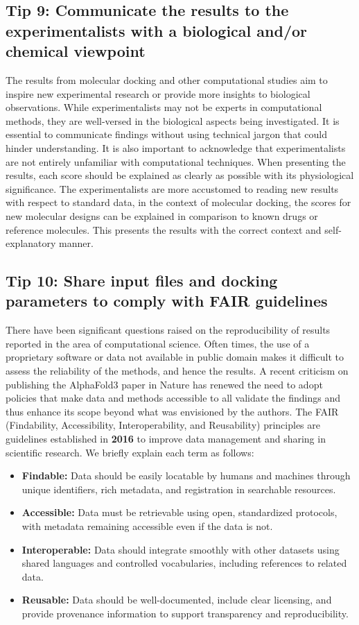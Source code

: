 \documentclass[10pt,letterpaper]{article}
\begin{document}
{{\subsection*{Tip 9: Communicate the results to the experimentalists with a biological and/or chemical viewpoint}
The results from molecular docking and other computational studies aim to inspire new experimental research or provide more insights to biological observations. While experimentalists may not be experts in computational methods, they are well-versed in the biological aspects being investigated. It is essential to communicate findings without using technical jargon that could hinder understanding. It is also important to acknowledge that experimentalists are not entirely unfamiliar with computational techniques. When presenting the results, each score should be explained as clearly as possible with its physiological significance. The experimentalists are more accustomed to reading new results with respect to standard data, in the context of molecular docking, the scores for new molecular designs can be explained in comparison to known drugs or reference molecules. This presents the results with the correct context and self-explanatory manner. 
    
\subsection*{Tip 10: Share input files and docking parameters to comply with FAIR guidelines}
There have been significant questions raised on the reproducibility of results reported in the area of computational science\cite{bib58, bib59}. Often times, the use of a proprietary software or data not available in public domain makes it difficult to assess the reliability of the methods, and hence the results. A recent criticism on publishing the AlphaFold3 paper in Nature\cite{bib57} has renewed the need to adopt policies that make data and methods accessible to all validate the findings and thus enhance its scope beyond what was envisioned by the authors. The FAIR (Findability, Accessibility, Interoperability, and Reusability) principles are guidelines established in \textbf{2016} to improve data management and sharing in scientific research\cite{bib60}. 
We briefly explain each term as follows: 
\begin{itemize}
    \item \textbf{Findable:} Data should be easily locatable by humans and machines through unique identifiers, rich metadata, and registration in searchable resources.
    \item \textbf{Accessible:} Data must be retrievable using open, standardized protocols, with metadata remaining accessible even if the data is not.
    \item \textbf{Interoperable:} Data should integrate smoothly with other datasets using shared languages and controlled vocabularies, including references to related data.
    \item \textbf{Reusable:} Data should be well-documented, include clear licensing, and provide provenance information to support transparency and reproducibility.
\end{itemize}

}}
\end{document}

